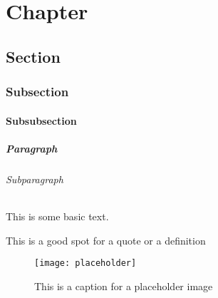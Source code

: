 \chapter{Chapter} %

\section{Section} %

\subsection{Subsection} %

\subsubsection{Subsubsection} %

\paragraph{Paragraph} %

\subparagraph{Subparagraph}  %

This is some basic text.

\begin{formal}
	This is a good spot for a quote or a definition
\end{formal}

\begin{figure}[H]
    \centering
    \texttt{[image: placeholder]}
    \caption{This is a caption for a placeholder image}
\end{figure}